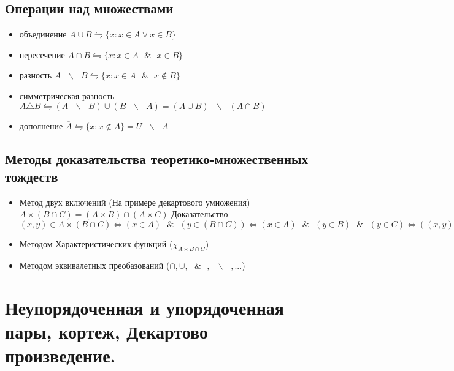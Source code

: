\documentclass{report}
\newcommand{\bslash}{\mbox{ } \backslash \mbox{ }}
\newcommand{\band}{\mbox{ } \& \mbox{ }}
\begin{document}
\subsection{Операции над множествами}
\begin{itemize}
    \item объединение $A \cup B \leftrightharpoons \{x: x \in A \lor x \in B\}$
    \item
          пересечение $A \cap B \leftrightharpoons \{x: x \in A \band x \in B\}$
    \item
          разность
          $ A \bslash B \leftrightharpoons \{x:x \in A \band x \notin B\}$
    \item
          симметрическая разность
          $A \triangle B \leftrightharpoons (A \bslash B) \cup (B \bslash A) = (A \cup B) \bslash (A \cap B)$
    \item
          дополнение
          $ \overline{A} \leftrightharpoons \{x: x \notin A\} = U \bslash A$
\end{itemize}

\subsection{Методы доказательства теоретико-множественных тождеств}


\begin{itemize}
    \item Метод двух включений (На примере декартового умножения)\newline
          $A \times (B \cap C) = (A \times B) \cap (A \times C)$\newline
          Доказательство\newline
          $(x,y) \in A \times (B \cap C) \Leftrightarrow (x \in A) \band (y \in (B \cap C)) \Leftrightarrow (x \in A) \band (y \in B) \band (y \in C) \Leftrightarrow ((x,y) \in A \times B) \band ((x,y) \in A \times C) \Leftrightarrow (x,y) \in (A \times B) \cap (A \times C)$
    \item Методом Характеристических функций ($\chi_{A \times {B \cap C}}$)
    \item Методом эквивалетных преобазований ($\cap, \cup, \band, \bslash, ...$)
\end{itemize}
\newpage

\section{Неупорядоченная и упорядоченная пары, кортеж, Декартово произведение.}
\end{document}
